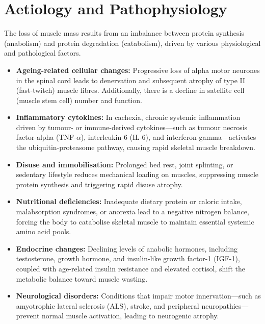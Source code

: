\section*{Aetiology and Pathophysiology}
The loss of muscle mass results from an imbalance between protein synthesis (anabolism) and protein degradation (catabolism), driven by various physiological and pathological factors.
\begin{itemize}
    \item \textbf{Ageing-related cellular changes:} Progressive loss of alpha motor neurones in the spinal cord leads to denervation and subsequent atrophy of type II (fast-twitch) muscle fibres. Additionally, there is a decline in satellite cell (muscle stem cell) number and function.
    \item \textbf{Inflammatory cytokines:} In cachexia, chronic systemic inflammation driven by tumour- or immune-derived cytokines—such as tumour necrosis factor-alpha (TNF-$\alpha$), interleukin-6 (IL-6), and interferon-gamma—activates the ubiquitin-proteasome pathway, causing rapid skeletal muscle breakdown.
    \item \textbf{Disuse and immobilisation:} Prolonged bed rest, joint splinting, or sedentary lifestyle reduces mechanical loading on muscles, suppressing muscle protein synthesis and triggering rapid disuse atrophy.
    \item \textbf{Nutritional deficiencies:} Inadequate dietary protein or caloric intake, malabsorption syndromes, or anorexia lead to a negative nitrogen balance, forcing the body to catabolise skeletal muscle to maintain essential systemic amino acid pools.
    \item \textbf{Endocrine changes:} Declining levels of anabolic hormones, including testosterone, growth hormone, and insulin-like growth factor-1 (IGF-1), coupled with age-related insulin resistance and elevated cortisol, shift the metabolic balance toward muscle wasting.
    \item \textbf{Neurological disorders:} Conditions that impair motor innervation—such as amyotrophic lateral sclerosis (ALS), stroke, and peripheral neuropathies—prevent normal muscle activation, leading to neurogenic atrophy.
\end{itemize}

